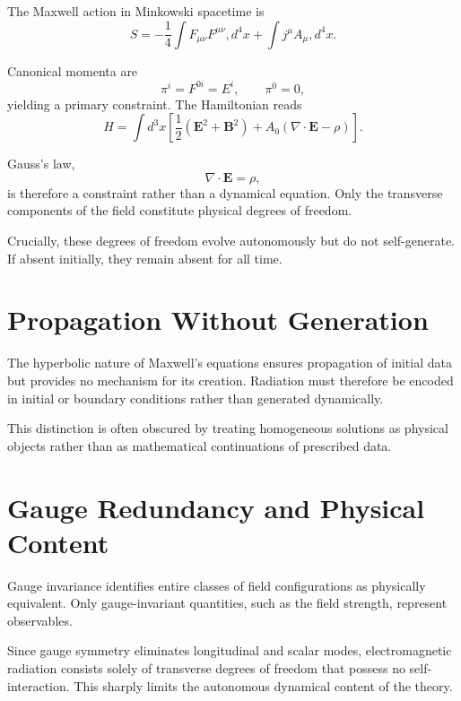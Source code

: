 \documentclass[11pt]{article}
\begin{document}
The Maxwell action in Minkowski spacetime is
\begin{equation}
S = -\frac{1}{4} \int F_{\mu\nu} F^{\mu\nu} , d^4x + \int j^\mu A_\mu , d^4x .
\end{equation}

Canonical momenta are
\begin{equation}
\pi^i = F^{0i} = E^i, \qquad \pi^0 = 0,
\end{equation}
yielding a primary constraint. The Hamiltonian reads
\begin{equation}
H = \int d^3x \left[ \frac{1}{2}(\mathbf{E}^2 + \mathbf{B}^2) + A_0(\nabla \cdot \mathbf{E} - \rho) \right].
\end{equation}

Gauss’s law,
\begin{equation}
\nabla \cdot \mathbf{E} = \rho,
\end{equation}
is therefore a constraint rather than a dynamical equation. Only the transverse components of the field constitute physical degrees of freedom.

Crucially, these degrees of freedom evolve autonomously but do not self-generate. If absent initially, they remain absent for all time.

\section{Propagation Without Generation}

The hyperbolic nature of Maxwell’s equations ensures propagation of initial data but provides no mechanism for its creation. Radiation must therefore be encoded in initial or boundary conditions rather than generated dynamically.

This distinction is often obscured by treating homogeneous solutions as physical objects rather than as mathematical continuations of prescribed data.

\section{Gauge Redundancy and Physical Content}

Gauge invariance identifies entire classes of field configurations as physically equivalent. Only gauge-invariant quantities, such as the field strength, represent observables.

Since gauge symmetry eliminates longitudinal and scalar modes, electromagnetic radiation consists solely of transverse degrees of freedom that possess no self-interaction. This sharply limits the autonomous dynamical content of the theory.
\end{document}
